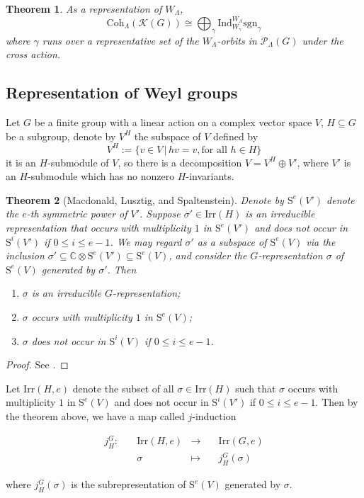 \documentclass[12pt, a4paper]{amsart}
\numberwithin{equation}{section}
\newtheorem{thm}{Theorem}[section]
\newcommand{\BC}{{\mathbb {C}}}
\newcommand{\CK}{{\mathcal {K}}}
\newcommand{\CP}{{\mathcal {P}}}
\newcommand{\Irr}{{\mathrm{Irr}}}
\newcommand{\sgn}{{\mathrm{sgn}}}
\newcommand{\set}[2]{\{#1\,|\,#2\}}
\newcommand{\defmap}[5]{
           \begin{equation*}
              \begin{aligned}
                   #1:\quad  & #2 &\longrightarrow &\quad #3 \\
                      \quad  & #4    &\longmapsto  &\quad #5
              \end{aligned}
           \end{equation*}
          }
\begin{document}
\begin{thm}\label{Coh} 
As a representation of $W_{\Lambda}$,
    \begin{equation}
        \mathrm{Coh}_{\Lambda}(\CK(G)) \cong \bigoplus_{\gamma} \mathrm{Ind}_{W_{\gamma}}^{W_{\Lambda}} \sgn_{\gamma}
    \end{equation}
    where $\gamma$ runs over a representative set of the $W_{\Lambda}$-orbits in $\CP_{\Lambda}(G)$ under the cross action.
\end{thm}


\subsection{Representation of Weyl groups}\label{2.2}
Let $G$ be a finite group with a linear action on a complex vector space $V$, $H \subseteq G$ be a subgroup, denote by $V^{H}$ the subspace of $V$ defined by
$$V^H := \set{v \in V}{hv = v, \textrm{for all $h \in H$}}$$
it is an $H$-submodule of $V$, so there is a decomposition $V = V^H \oplus V'$, where $V'$ is an $H$-submodule which has no nonzero $H$-invariants.

\begin{thm}[Macdonald, Lusztig, and Spaltenstein]\label{j-ind}
    Denote by $\mathrm{S}^e(V')$ denote the $e$-th symmetric power of $V'$. Suppose $\sigma' \in \Irr(H)$ is an irreducible representation that occurs with multiplicity $1$ in $\mathrm{S}^e(V')$ and does not occur in $\mathrm{S}^{i}(V')$ if $0 \leq i \leq e-1$. We may regard $\sigma'$ as a subspace of $\mathrm{S}^e(V)$ via the inclusion $\sigma' \subseteq \BC \otimes \mathrm{S}^e(V') \subseteq \mathrm{S}^e(V)$, and consider the $G$-representation $\sigma$ of $\mathrm{S}^e(V)$ generated by $\sigma'$. Then
    \begin{enumerate}
        \item $\sigma$ is an irreducible $G$-representation;
        \item $\sigma$ occurs with multiplicity $1$ in $\mathrm{S}^e(V)$;
        \item $\sigma$ does not occur in $\mathrm{S}^{i}(V)$ if $0 \leq i \leq e-1$.
    \end{enumerate}
\end{thm}

\begin{proof}
    See \cite[Theorem 11.2.1]{Car}.
\end{proof}

Let $\Irr(H,e)$ denote the subset of all $\sigma \in \Irr(H)$ such that $\sigma$ occurs with multiplicity $1$ in $\mathrm{S}^e(V)$ and does not occur in $\mathrm{S}^{i}(V')$ if $0 \leq i \leq e-1$.  Then by the theorem above, we have a map called $j$-induction
\defmap{j_H^G}{\Irr(H,e)}{\Irr(G,e)}{\sigma}{j_{H}^{G}(\sigma)}
where $j_{H}^{G}(\sigma)$ is the subrepresentation of $\mathrm{S}^e(V)$ generated by $\sigma$.
\end{document}
